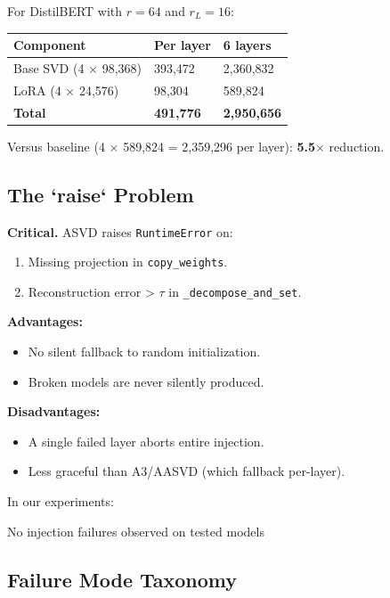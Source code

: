 For DistilBERT with $r = 64$ and $r_L = 16$:

\begin{table}[H]
\centering
\small
\begin{tabular}{lll}
\toprule
\textbf{Component} & \textbf{Per layer} & \textbf{6 layers} \\
\midrule
Base SVD (4 $\times$ 98,368) & 393,472 & 2,360,832 \\
LoRA (4 $\times$ 24,576) & 98,304 & 589,824 \\
\textbf{Total} & \textbf{491,776} & \textbf{2,950,656} \\
\bottomrule
\end{tabular}
\end{table}

Versus baseline (4 $\times$ 589,824 = 2,359,296 per layer): \textbf{5.5$\times$} 
reduction.

\subsection{The `raise` Problem}

\textbf{Critical.} ASVD raises \texttt{RuntimeError} on:

\begin{enumerate}
\item Missing projection in \texttt{copy\_weights}.
\item Reconstruction error \textgreater{} $\tau$ in \texttt{\_decompose\_and\_set}.

\end{enumerate}
\textbf{Advantages:}
\begin{itemize}
\item No silent fallback to random initialization.
\item Broken models are never silently produced.

\end{itemize}
\textbf{Disadvantages:}
\begin{itemize}
\item A single failed layer aborts entire injection.
\item Less graceful than A3/AASVD (which fallback per-layer).

\end{itemize}
In our experiments:

No injection failures observed on tested models

\subsection{Failure Mode Taxonomy}


